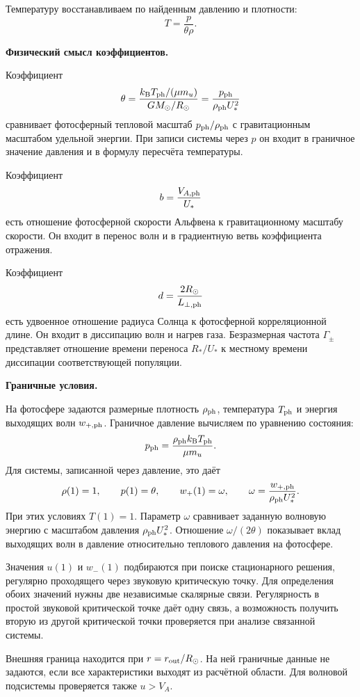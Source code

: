 \documentclass[12pt,a4paper]{article}
\begin{document}
Температуру восстанавливаем по найденным
давлению и плотности:
\[
T=\frac{p}{\theta\rho}.
\]

\medskip
\noindent\textbf{Физический смысл коэффициентов.}

Коэффициент
\[
\theta
=\frac{k_{\rm B}T_{\rm ph}/(\mu m_u)}{GM_\odot/R_\odot}
=\frac{p_{\rm ph}}{\rho_{\rm ph}U_*^2}
\]
сравнивает фотосферный тепловой масштаб $p_{\rm ph}/\rho_{\rm ph}$
с гравитационным масштабом удельной энергии.
При записи системы через $p$ он входит в граничное
значение давления и в формулу пересчёта температуры.

Коэффициент
\[
b=\frac{V_{A,{\rm ph}}}{U_*}
\]
есть отношение фотосферной скорости Альфвена
к гравитационному масштабу скорости.
Он входит в перенос волн и в градиентную ветвь
коэффициента отражения.

Коэффициент
\[
d=\frac{2R_\odot}{L_{\perp,{\rm ph}}}
\]
есть удвоенное отношение радиуса Солнца
к фотосферной корреляционной длине.
Он входит в диссипацию волн и нагрев газа.
Безразмерная частота $\Gamma_\pm$ представляет
отношение времени переноса $R_*/U_*$ к местному
времени диссипации соответствующей популяции.

\medskip
\noindent\textbf{Граничные условия.}

На фотосфере задаются размерные плотность
$\rho_{\rm ph}$, температура $T_{\rm ph}$
и энергия выходящих волн $w_{+,{\rm ph}}$.
Граничное давление вычисляем по уравнению состояния:
\[
p_{\rm ph}=\frac{\rho_{\rm ph}k_{\rm B}T_{\rm ph}}{\mu m_u}.
\]
Для системы, записанной через давление, это даёт
\[
\rho(1)=1,\qquad
p(1)=\theta,\qquad
w_+(1)=\omega,\qquad
\omega=\frac{w_{+,{\rm ph}}}{\rho_{\rm ph}U_*^2}.
\]
При этих условиях $T(1)=1$.
Параметр $\omega$ сравнивает заданную волновую
энергию с масштабом давления $\rho_{\rm ph}U_*^2$.
Отношение $\omega/(2\theta)$ показывает вклад
выходящих волн в давление относительно теплового
давления на фотосфере.

Значения $u(1)$ и $w_-(1)$ подбираются при поиске
стационарного решения, регулярно проходящего через
звуковую критическую точку. Для определения обоих
значений нужны две независимые скалярные связи.
Регулярность в простой звуковой критической точке
даёт одну связь, а возможность получить вторую
из другой критической точки проверяется
при анализе связанной системы.

Внешняя граница находится при $r=r_{\rm out}/R_\odot$.
На ней граничные данные не задаются, если все
характеристики выходят из расчётной области.
Для волновой подсистемы проверяется также $u>V_A$.
\end{document}
